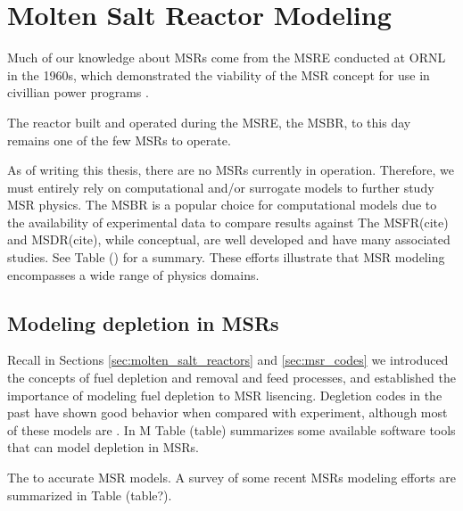 \chapter{Molten Salt Reactor Modeling}%
\label{cha:msr_modeling}
Much of our knowledge about \Gls{MSR}s come from the \Gls{MSRE} conducted at \Gls{ORNL} in the 1960s, which demonstrated the viability of the \Gls{MSR} concept for use in civillian power programs \cite{haubenreich_experience_1970} \cite{rosenthal_molten-salt_1970}. 

The reactor built and operated during the \Gls{MSRE}, the \Gls{MSBR}, to this day remains one of the few \Gls{MSR}s to operate.

As of writing this thesis, there are no \Gls{MSR}s currently in operation. Therefore, we must entirely rely on computational and/or surrogate models to further study \Gls{MSR} physics. The \Gls{MSBR} is a popular choice for computational models due to the availability of experimental data to compare results against %
The \Gls{MSFR}(cite) and \Gls{MSDR}(cite), while conceptual, are well developed and have many associated studies. See Table () for a summary. These efforts illustrate that \Gls{MSR} modeling encompasses a wide range of physics domains.


\section{Modeling depletion in \Gls{MSR}s}
Recall in Sections
\ref{sec:molten_salt_reactors} and \ref{sec:msr_codes} we introduced the concepts of fuel depletion and removal and feed processes, and established the importance of modeling fuel depletion to \Gls{MSR} lisencing. Degletion codes in the past have shown good behavior when compared with experiment, although most of these models are . In M Table (table) summarizes some available software tools that can model depletion in \Gls{MSR}s.


The to accurate \Gls{MSR} models.
A survey of some recent \Gls{MSR}s modeling efforts are summarized in Table (table?). 



